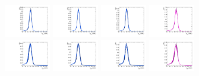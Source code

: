 \begin{figure}[htbp]
  \includegraphics[width=0.18\textwidth]{fig/2Dfit/templateSignalVsMX_fromDC_VBFGbuToWW_MJJ_mu_HP_nobb_HDy.pdf}
  \includegraphics[width=0.18\textwidth]{fig/2Dfit/templateSignalVsMX_fromDC_VBFRadToWW_MJJ_mu_HP_nobb_HDy.pdf}
  \includegraphics[width=0.18\textwidth]{fig/2Dfit/templateSignalVsMX_fromDC_VBFZprToWW_MJJ_mu_HP_nobb_HDy.pdf}
  \includegraphics[width=0.18\textwidth]{fig/2Dfit/templateSignalVsMX_fromDC_VBFWprToWZ_MJJ_mu_HP_nobb_HDy.pdf}\\
  \includegraphics[width=0.18\textwidth]{fig/2Dfit/templateSignalVsMX_fromDC_VBFGbuToWW_MJJ_mu_LP_nobb_HDy.pdf}
  \includegraphics[width=0.18\textwidth]{fig/2Dfit/templateSignalVsMX_fromDC_VBFRadToWW_MJJ_mu_LP_nobb_HDy.pdf}
  \includegraphics[width=0.18\textwidth]{fig/2Dfit/templateSignalVsMX_fromDC_VBFZprToWW_MJJ_mu_LP_nobb_HDy.pdf}
  \includegraphics[width=0.18\textwidth]{fig/2Dfit/templateSignalVsMX_fromDC_VBFWprToWZ_MJJ_mu_LP_nobb_HDy.pdf}\\

\end{figure}
